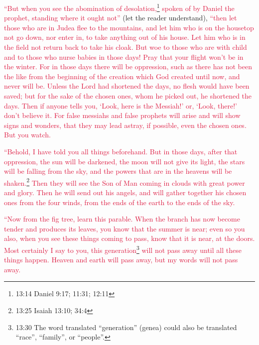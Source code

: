 \myverse{}\textcolor{crimson}{“But when you see the abomination of desolation,}\footnote{13:14 Daniel 9:17;
	11:31;
	12:11}
\textcolor{crimson}{spoken of by Daniel the prophet, standing where it ought not”} (let the reader understand),
\textcolor{crimson}{“then let those who are in Judea flee to the mountains,
}
\myverse{}\textcolor{crimson}{and let him who is on the housetop not go down, nor enter in, to take
	anything out of his house.
}
\myverse{}\textcolor{crimson}{Let him who is in the field not return back to take his cloak.
}
\myverse{}\textcolor{crimson}{But woe to those who are with child and to those who nurse babies in
	those days!
}
\myverse{}\textcolor{crimson}{Pray that your flight won’t be in the winter.
}
\myverse{}\textcolor{crimson}{For in those days there will be oppression, such as there has not been
	the like from the beginning of the creation which God created until now, and never will be.
}
\myverse{}\textcolor{crimson}{Unless the Lord had shortened the days, no flesh would have been saved;
	but for the sake of the chosen ones, whom he picked out, he shortened the days.
}
\myverse{}\textcolor{crimson}{Then if anyone tells you, ‘Look, here is the Messiah!’ or, ‘Look, there!’
	don’t believe it.
}
\myverse{}\textcolor{crimson}{For false messiahs and false prophets will arise and will show signs
	and wonders, that they may lead astray, if possible, even the chosen ones.
}
\myverse{}\textcolor{crimson}{But you watch.}

\textcolor{crimson}{“Behold, I have told you all things beforehand.
}
\myverse{}\textcolor{crimson}{But in those days, after that oppression, the sun will be darkened, the
	moon will not give its light,
}
\myverse{}\textcolor{crimson}{the stars will be falling from the sky, and the powers that are in the heavens will be shaken.}\footnote{13:25 Isaiah 13:10; 34:4} \myverse{}\textcolor{crimson}{Then they will see the Son of Man coming in clouds with great power and glory.} \myverse{}\textcolor{crimson}{Then he will send out his angels, and will gather together his chosen ones from the four winds, from the ends of the earth to the ends of the sky.}

\myverse{}\textcolor{crimson}{“Now from the fig tree, learn this parable. When the branch
	has now become tender and produces its leaves, you know that the summer is near;
}
\myverse{}\textcolor{crimson}{even so you also, when you see these things coming to pass, know that
	it is near, at the doors.
}
\myverse{}\textcolor{crimson}{Most certainly I say to you, this generation}\footnote{13:30 The word translated “generation” (genea) could also be translated “race”, “family”, or “people”.}
\textcolor{crimson}{will not pass away until all these things happen.
}
\myverse{}\textcolor{crimson}{Heaven and earth will pass away, but my words will not pass away.
}

